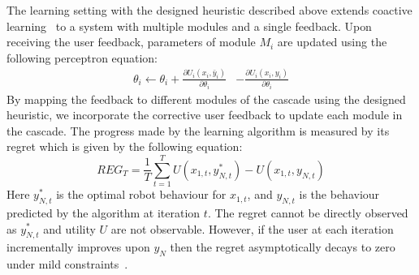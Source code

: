 The learning setting with the designed heuristic described above extends coactive learning~\citep{Jain13,Shivaswamy12} to a system with multiple modules and a single feedback. Upon receiving the user feedback, parameters of module $M_i$ are updated using the following perceptron equation:  
\begin{align}
\theta_i \leftarrow \theta_i +  \frac{\partial U_i(x_i,\bar{y}_i)}{\partial \theta_i} &- \frac{\partial U_i(x_i,{y}_i)}{\partial \theta_i}
\end{align}
By mapping the feedback to different modules of the cascade using the designed heuristic, we incorporate the corrective user feedback to update each module in the cascade. The progress made by the learning algorithm is measured by its regret which is given by the following equation:%
\begin{equation}
\label{eq:regret}
REG_T = \frac{1}{T}\sum_{t=1}^T U(x_{1,t},y_{N,t}^*) - U(x_{1,t},y_{N,t}) 
\end{equation}
Here $y_{N,t}^*$ is the optimal robot behaviour for $x_{1,t}$, and $y_{N,t}$ is the behaviour predicted by the algorithm at iteration $t$. The regret cannot be directly observed as $y_{N,t}^*$ and utility $U$ are not observable. However, if the user at each iteration incrementally improves upon $y_N$ then the regret asymptotically decays to zero under mild constraints~\citep{Shivaswamy12,Jain13}.  